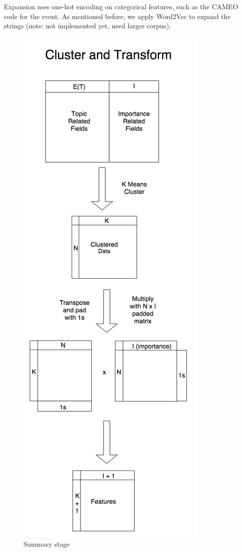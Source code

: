 Expansion uses one-hot encoding on categorical features, such as the CAMEO code for the event. As mentioned before, we apply Word2Vec to expand the strings (note: not implemented yet, need larger corpus). %


\begin{figure}[ht]
\vskip 0.2in
\begin{center}
\centerline{\includegraphics[scale=0.15]{images/cluster_and_transform_vertical.png}}
\caption{Summary stage}
\end{center}
\vskip -0.2in
\label{fig:summarization}
\end{figure}

